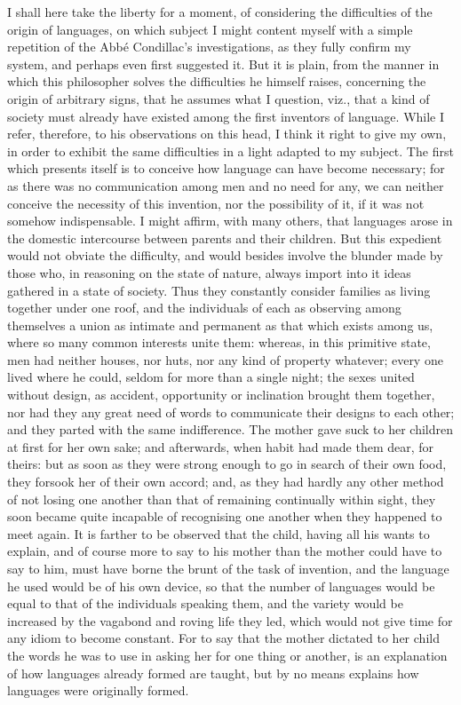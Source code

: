 \documentclass[12pt]{report}
\begin{document}
I shall here take the liberty for a moment, of considering the difficulties of the origin of languages, on which subject I might content myself with a simple repetition of the Abbé Condillac's investigations, as they fully confirm my system, and perhaps even first suggested it. But it is plain, from the manner in which this philosopher solves the difficulties he himself raises, concerning the origin of arbitrary signs, that he assumes what I question, viz., that a kind of society must already have existed among the first inventors of language. While I refer, therefore, to his observations on this head, I think it right to give my own, in order to exhibit the same difficulties in a light adapted to my subject. The first which presents itself is to conceive how language can have become necessary; for as there was no communication among men and no need for any, we can neither conceive the necessity of this invention, nor the possibility of it, if it was not somehow indispensable. I might affirm, with many others, that languages arose in the domestic intercourse between parents and their children. But this expedient would not obviate the difficulty, and would besides involve the blunder made by those who, in reasoning on the state of nature, always import into it ideas gathered in a state of society. Thus they constantly consider families as living together under one roof, and the individuals of each as observing among themselves a union as intimate and permanent as that which exists among us, where so many common interests unite them: whereas, in this primitive state, men had neither houses, nor huts, nor any kind of property whatever; every one lived where he could, seldom for more than a single night; the sexes united without design, as accident, opportunity or inclination brought them together, nor had they any great need of words to communicate their designs to each other; and they parted with the same indifference. The mother gave suck to her children at first for her own sake; and afterwards, when habit had made them dear, for theirs: but as soon as they were strong enough to go in search of their own food, they forsook her of their own accord; and, as they had hardly any other method of not losing one another than that of remaining continually within sight, they soon became quite incapable of recognising one another when they happened to meet again. It is farther to be observed that the child, having all his wants to explain, and of course more to say to his mother than the mother could have to say to him, must have borne the brunt of the task of invention, and the language he used would be of his own device, so that the number of languages would be equal to that of the individuals speaking them, and the variety would be increased by the vagabond and roving life they led, which would not give time for any idiom to become constant. For to say that the mother dictated to her child the words he was to use in asking her for one thing or another, is an explanation of how languages already formed are taught, but by no means explains how languages were originally formed.
\end{document}
